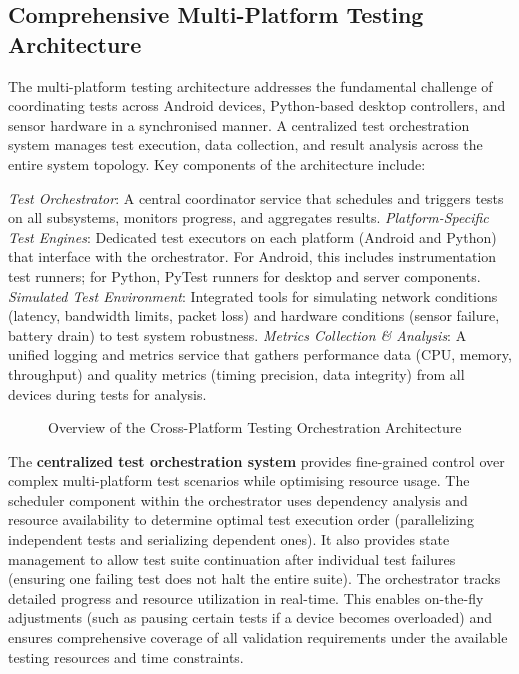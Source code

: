 \documentclass[11pt,a4paper]{report}
\begin{document}
\subsection{Comprehensive Multi-Platform Testing Architecture}
The multi-platform testing architecture addresses the fundamental challenge of coordinating tests across Android devices, Python-based desktop controllers, and sensor hardware in a synchronised manner. A centralized test orchestration system manages test execution, data collection, and result analysis across the entire system topology. Key components of the architecture include:

\textit{Test Orchestrator}: A central coordinator service that schedules and triggers tests on all subsystems, monitors progress, and aggregates results.
\textit{Platform-Specific Test Engines}: Dedicated test executors on each platform (Android and Python) that interface with the orchestrator. For Android, this includes instrumentation test runners; for Python, PyTest runners for desktop and server components.
\textit{Simulated Test Environment}: Integrated tools for simulating network conditions (latency, bandwidth limits, packet loss) and hardware conditions (sensor failure, battery drain) to test system robustness.
\textit{Metrics Collection & Analysis}: A unified logging and metrics service that gathers performance data (CPU, memory, throughput) and quality metrics (timing precision, data integrity) from all devices during tests for analysis.
\begin{figure}[h]
\centering
\caption{Overview of the Cross-Platform Testing Orchestration Architecture}
\label{fig:chapter5-2}
\end{figure}
The \textbf{centralized test orchestration system} provides fine-grained control over complex multi-platform test scenarios while optimising resource usage. The scheduler component within the orchestrator uses dependency analysis and resource availability to determine optimal test execution order (parallelizing independent tests and serializing dependent ones). It also provides state management to allow test suite continuation after individual test failures (ensuring one failing test does not halt the entire suite).
The orchestrator tracks detailed progress and resource utilization in real-time. This enables on-the-fly adjustments (such as pausing certain tests if a device becomes overloaded) and ensures comprehensive coverage of all validation requirements under the available testing resources and time constraints.
\end{document}
